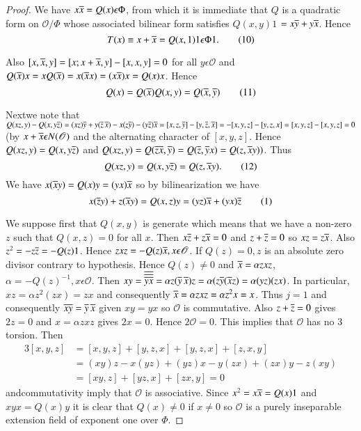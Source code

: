 \begin{proof}
We have $x\overline{x}=Q(x)\epsilon \Phi$, from which it is immediate that
$Q$ is a quadratic form on $\mathscr{O}/\Phi$ whose associated
bilinear form satisfies $Q(x,y)1$ $=x\overline{y}+y\overline{x}$. Hence
\begin{equation*}
  T(x)\equiv x+\overline{x}=Q(x,1)1\epsilon \Phi 1.\tag{10}\label{c3:eq10}
\end{equation*}

Also $[x,\overline{x},y]=[x;x+\overline{x},y]-[x,x,y]=0$ for all $y\epsilon
\mathscr{O}$ and $Q(\overline{x})x=xQ(\overline{x})=x(\overline{x} x)=(x
\overline{x})x=Q(x)x$. Hence
\begin{equation*}
  Q(x)=Q(\overline{x})Q(x,y)=Q(\overline{x}, \overline{y})\tag{11}\label{c3:eq11}
\end{equation*}

Next\pageoriginale we note that
$Q(xz,y)-Q(x,y\overline{z})=(xz)\overline{y}+y(\overline{z}\, \overline{x})-x(z\overline{y})-(y\overline{z})\overline{x}=[x,z,\overline{y}]-[y,\overline{z},\overline{x}]=-[x,y,z]-[y,z,x]=[x,y,z]-[x,y,z]=0$
(by $x+\overline{x}\epsilon N(\mathscr{O})$ and the alternating character of
$[x,y,z]$. Hence $Q(xz,y)=Q(x,y\overline{z})$ and
$Q(xz,y)=Q(\overline{zx},\overline{y})=Q(\overline{z},\overline{y}x)=Q(z,\overline{x}y))$. Thus
\begin{equation*}
  Q(xz,y)=Q(x,y\overline{z})=Q(z,\overline{x}y).\tag{12}\label{c3:eq12}
\end{equation*}
We have $x(\overline{x}y)=Q(x)y=(yx)\overline{x}$ so by bilinearization we have
\begin{equation*}
x(\overline{z}y)+z(\overline{x}y)=Q(x,z)y=(yz)\overline{x}+(yx)\overline{z}\tag{1}\label{c3:eq13}
\end{equation*}

We suppose first that $Q(x,y)$ is generate which means that we have a
non-zero $z$ such that $Q(x,z)=0$ for all $x$. Then
$x\overline{z}+z\overline{x}=0$ and $z+\overline{z}=0$ so $xz=z\overline{x}$. Also
$z^{2}=-z\overline{z}=-Q(z)1$. Hence $zxz=-Q(z)\overline{x}, x\epsilon
\mathscr{O}$. If $Q(z)=0,z$ is an absolute zero divisor contrary to
hypothesis. Hence $Q(z)\neq 0$ and $\overline{x}=\alpha zxz$,
$\alpha=-Q(z)^{-1},x\epsilon \mathscr{O}$. Then
$xy=\overline{\overline{\overline{y}\overline{x}}}=\alpha z(\overline{y}\,\overline{x})z=\alpha
(z\overline{y}(\overline{x}z)=\alpha(yz)(zx)$. In particular,
$xz=\alpha z^{2}(zx)=zx$ and consequently  $\overline{x}=\alpha zxz=\alpha
z^{2}x=x$. Thus $j=1$ and consequently $\overline{xy}=\overline{y}\, \overline{x}$ given
$xy=yx$ so $\mathscr{O}$ is commutative. Also $z+\overline{z}=0$ gives $2z=0$
and $x=\alpha z x z$ gives $2x=0$. Hence $2\mathscr{O}=0$. This
implies that $\mathscr{O}$ has no $3$ torsion. Then
\begin{align*}
3[x,y,z]&=[x,y,z]+[y,z,x]+[y,z,x]+[z,x,y]\\
&=(xy)z-x(yz)+(yz)x-y(zx)+(zx)y-z(xy)\\
&=[xy, z]+[yz,x]+[zx,y]=0
\end{align*}
and\pageoriginale commutativity imply that $\mathscr{O}$ is
associative. Since $x^{2}=x\overline{x}=Q(x)1$ and $xyx=Q(x)y$ it is clear
that $Q(x)\neq 0$ if $x\neq 0$ so $\mathscr{O}$ is a purely
inseparable extension field of exponent one over $\Phi$.


\end{proof}
